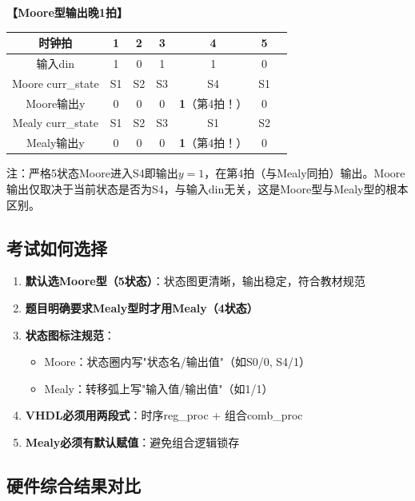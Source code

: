 \textbf{【Moore型输出晚1拍】}

\begin{center}
\begin{tabular}{|c|c|c|c|c||c|c|}\hline
时钟拍 & 1 & 2 & 3 & 4 & 5 \\ \hline
输入din & 1 & 0 & 1 & 1 & 0 \\ \hline
Moore curr\_state & S1 & S2 & S3 & S4 & S1 \\ \hline
Moore输出y & 0 & 0 & 0 & \textbf{1}（第4拍！）& 0 \\ \hline
\hline
Mealy curr\_state & S1 & S2 & S3 & S1 & S2 \\ \hline
Mealy输出y & 0 & 0 & 0 & \textbf{1}（第4拍！）& 0 \\ \hline
\end{tabular}
\end{center}

注：严格5状态Moore进入S4即输出$y=1$，在第4拍（与Mealy同拍）输出。Moore输出仅取决于当前状态是否为S4，与输入din无关，这是Moore型与Mealy型的根本区别。

\subsection{考试如何选择}

\begin{examtip}
\begin{enumerate}
  \item \textbf{默认选Moore型（5状态）}：状态图更清晰，输出稳定，符合教材规范
  \item \textbf{题目明确要求Mealy型时才用Mealy（4状态）}
  \item \textbf{状态图标注规范}：
  \begin{itemize}
    \item Moore：状态圈内写"状态名/输出值"（如S0/0, S4/1）
    \item Mealy：转移弧上写"输入值/输出值"（如1/1）
  \end{itemize}
  \item \textbf{VHDL必须用两段式}：时序reg\_proc + 组合comb\_proc
  \item \textbf{Mealy必须有默认赋值}：避免组合逻辑锁存
\end{enumerate}
\end{examtip}

\subsection{硬件综合结果对比}

